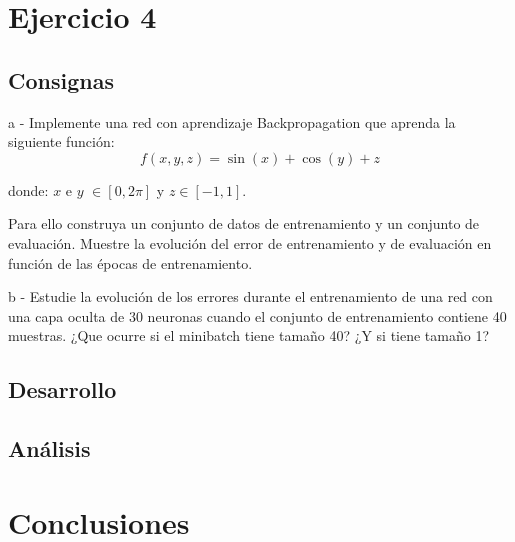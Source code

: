 \documentclass[11pt]{article} %
\begin{document}
\section{Ejercicio 4}

\subsection{Consignas}

a - Implemente una red con aprendizaje Backpropagation que aprenda la siguiente función:
$$
f (x , y , z)= \sin(x)+\cos(y)+z
$$

donde: $x$ e $y$ $\in [0,2 \pi]$ y $z \in [-1,1]$.

Para ello construya un conjunto de datos de entrenamiento y un conjunto de evaluación. Muestre la evolución del error de entrenamiento y de evaluación en función de las épocas de entrenamiento.

b - Estudie la evolución de los errores durante el entrenamiento de una red con una capa oculta de 30 neuronas cuando el conjunto de entrenamiento contiene 40 muestras. ¿Que ocurre si el minibatch tiene tamaño 40? ¿Y si tiene tamaño 1?

\subsection{Desarrollo}

\subsection{Análisis}

\section{Conclusiones}
\end{document}
